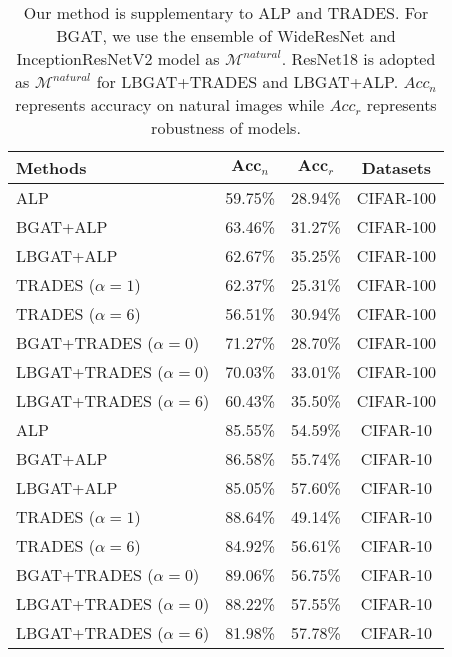 \documentclass[10pt,twocolumn,letterpaper]{article}
\begin{document}
\begin{table}[h]
	\centering
	\caption{Our method is supplementary to ALP and TRADES. For BGAT, we use the ensemble of WideResNet and InceptionResNetV2 model as $\mathcal{M}^{natural}$. ResNet18 is adopted as $\mathcal{M}^{natural}$ for LBGAT+TRADES and LBGAT+ALP. $Acc_{n}$ represents accuracy on natural images while $Acc_{r}$ represents robustness of models.} 
	\resizebox{1.00\linewidth}{!}
	{
	\begin{tabular}{l|c|c|c}
		\textbf{Methods} &$\textbf{Acc}_{n}$ &$\textbf{Acc}_{r}$ &\textbf{Datasets} \\
		\hline
		\hline
		ALP      & 59.75\% & 28.94\% &CIFAR-100\\
		BGAT+ALP  & 63.46\% & 31.27\% &CIFAR-100\\
		LBGAT+ALP & 62.67\% & 35.25\% &CIFAR-100\\
		TRADES ($\alpha=1$)      &62.37\% &25.31\% &CIFAR-100 \\
		TRADES ($\alpha=6$)      &56.51\% &30.94\% &CIFAR-100 \\
		BGAT+TRADES ($\alpha=0$)  &71.27\% &28.70\% &CIFAR-100 \\
		LBGAT+TRADES ($\alpha=0$) &70.03\% &33.01\% &CIFAR-100 \\
		LBGAT+TRADES ($\alpha=6$) &60.43\% &35.50\% &CIFAR-100 \\
		\hline
		ALP       &85.55\% &54.59\% &CIFAR-10\\
		BGAT+ALP  &86.58\% &55.74\% &CIFAR-10\\
		LBGAT+ALP &85.05\% &57.60\% &CIFAR-10\\
		TRADES ($\alpha=1$) &88.64\% &49.14\% &CIFAR-10 \\
		TRADES ($\alpha=6$)       &84.92\% &56.61\% &CIFAR-10 \\
		BGAT+TRADES ($\alpha=0$)  &89.06\% &56.75\% &CIFAR-10 \\
		LBGAT+TRADES ($\alpha=0$) &88.22\% &57.55\% &CIFAR-10 \\
		LBGAT+TRADES ($\alpha=6$) &81.98\% &57.78\% &CIFAR-10 \\
		\hline
	\end{tabular}
    }
	\label{tab:flexibility}
\end{table}
\end{document}
